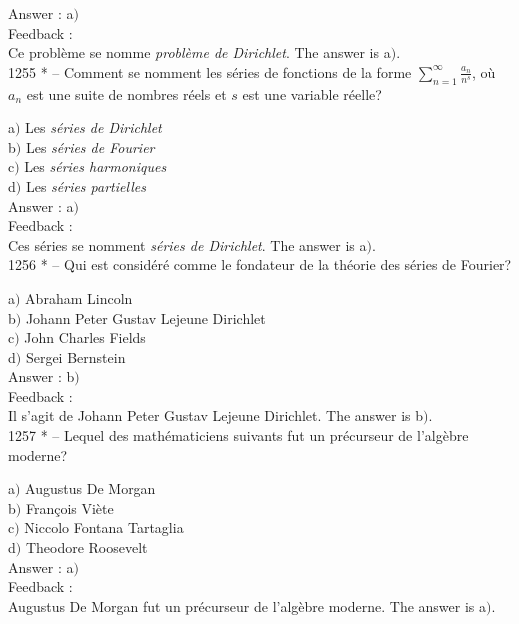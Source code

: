 ﻿\documentclass[letterpaper, 12pt]{article}
\begin{document}
Answer : a$)$\\

Feedback : \\
Ce probl\`eme se nomme {\sl probl\`eme de Dirichlet}.
The answer is a$)$.\\

1255 * -- Comment se nomment les s\'eries de fonctions de la forme
$\sum_{n=1}^{\infty}\frac{a_n}{n^s}$, o\`u $a_n$ est une suite de
nombres r\'eels et $s$ est une variable r\'eelle?

a$)$ Les {\sl s\'eries de Dirichlet} \\
b$)$ Les {\sl s\'eries de Fourier} \\
c$)$ Les {\sl s\'eries harmoniques} \\
d$)$ Les {\sl s\'eries partielles}\\

Answer : a$)$\\

Feedback : \\
Ces s\'eries se nomment {\sl s\'eries de Dirichlet}.
The answer is a$)$.\\

1256 * -- Qui est consid\'er\'e comme le fondateur de la {th\'eorie
des s\'eries de Fourier}?

a$)$ Abraham Lincoln \\
b$)$ Johann Peter Gustav Lejeune Dirichlet \\
c$)$ John Charles Fields \\
d$)$ Sergei Bernstein\\

Answer : b$)$\\

Feedback : \\
Il s'agit de Johann Peter Gustav Lejeune Dirichlet.
The answer is b$)$.\\

1257 * -- Lequel des math\'ematiciens suivants fut un pr\'ecurseur
de l'alg\`ebre moderne?

a$)$ Augustus De Morgan \\
b$)$ Fran\c cois Vi\`ete \\
c$)$ Niccolo Fontana Tartaglia\\
d$)$ Theodore Roosevelt\\

Answer : a$)$\\

Feedback : \\
Augustus De Morgan fut un pr\'ecurseur de l'alg\`ebre moderne.
The answer is a$)$.\\
\end{document}

